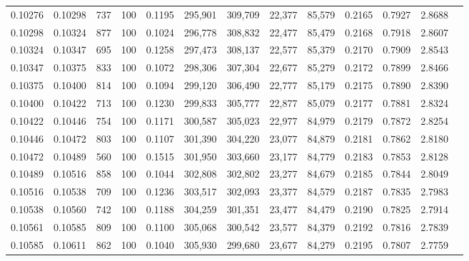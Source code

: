\begin{tabular}{rrrrrrrrrrrrr}
0.10276 & 0.10298 &   737 & 100 &                                     0.1195 & 295,901 & 309,709 &  22,377 &  85,579 & 0.2165 & 0.7927 & 2.8688 \\
0.10298 & 0.10324 &   877 & 100 &                                     0.1024 & 296,778 & 308,832 &  22,477 &  85,479 & 0.2168 & 0.7918 & 2.8607 \\
0.10324 & 0.10347 &   695 & 100 &                                     0.1258 & 297,473 & 308,137 &  22,577 &  85,379 & 0.2170 & 0.7909 & 2.8543 \\
0.10347 & 0.10375 &   833 & 100 &                                     0.1072 & 298,306 & 307,304 &  22,677 &  85,279 & 0.2172 & 0.7899 & 2.8466 \\
0.10375 & 0.10400 &   814 & 100 &                                     0.1094 & 299,120 & 306,490 &  22,777 &  85,179 & 0.2175 & 0.7890 & 2.8390 \\
0.10400 & 0.10422 &   713 & 100 &                                     0.1230 & 299,833 & 305,777 &  22,877 &  85,079 & 0.2177 & 0.7881 & 2.8324 \\
0.10422 & 0.10446 &   754 & 100 &                                     0.1171 & 300,587 & 305,023 &  22,977 &  84,979 & 0.2179 & 0.7872 & 2.8254 \\
0.10446 & 0.10472 &   803 & 100 &                                     0.1107 & 301,390 & 304,220 &  23,077 &  84,879 & 0.2181 & 0.7862 & 2.8180 \\
0.10472 & 0.10489 &   560 & 100 &                                     0.1515 & 301,950 & 303,660 &  23,177 &  84,779 & 0.2183 & 0.7853 & 2.8128 \\
0.10489 & 0.10516 &   858 & 100 &                                     0.1044 & 302,808 & 302,802 &  23,277 &  84,679 & 0.2185 & 0.7844 & 2.8049 \\
0.10516 & 0.10538 &   709 & 100 &                                     0.1236 & 303,517 & 302,093 &  23,377 &  84,579 & 0.2187 & 0.7835 & 2.7983 \\
0.10538 & 0.10560 &   742 & 100 &                                     0.1188 & 304,259 & 301,351 &  23,477 &  84,479 & 0.2190 & 0.7825 & 2.7914 \\
0.10561 & 0.10585 &   809 & 100 &                                     0.1100 & 305,068 & 300,542 &  23,577 &  84,379 & 0.2192 & 0.7816 & 2.7839 \\
0.10585 & 0.10611 &   862 & 100 &                                     0.1040 & 305,930 & 299,680 &  23,677 &  84,279 & 0.2195 & 0.7807 & 2.7759 \\

\end{tabular}

